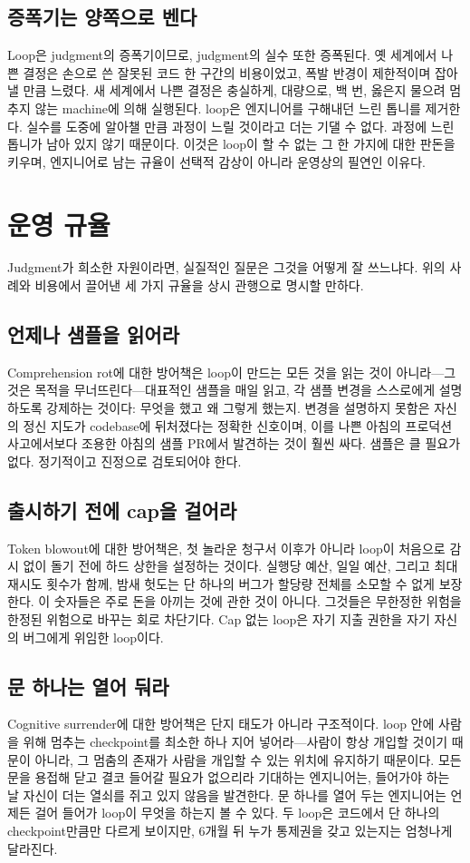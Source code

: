 \documentclass[conference]{IEEEtran}
\begin{document}
\subsection{증폭기는 양쪽으로 벤다}
Loop은 judgment의 증폭기이므로, judgment의 실수 또한 증폭된다. 옛 세계에서 나쁜 결정은 손으로 쓴 잘못된 코드 한 구간의 비용이었고, 폭발 반경이 제한적이며 잡아낼 만큼 느렸다. 새 세계에서 나쁜 결정은 충실하게, 대량으로, 백 번, 옳은지 물으려 멈추지 않는 machine에 의해 실행된다. loop은 엔지니어를 구해내던 느린 톱니를 제거한다. 실수를 도중에 알아챌 만큼 과정이 느릴 것이라고 더는 기댈 수 없다. 과정에 느린 톱니가 남아 있지 않기 때문이다. 이것은 loop이 할 수 없는 그 한 가지에 대한 판돈을 키우며, 엔지니어로 남는 규율이 선택적 감상이 아니라 운영상의 필연인 이유다.

\section{운영 규율}
Judgment가 희소한 자원이라면, 실질적인 질문은 그것을 어떻게 잘 쓰느냐다. 위의 사례와 비용에서 끌어낸 세 가지 규율을 상시 관행으로 명시할 만하다.

\subsection{언제나 샘플을 읽어라}
Comprehension rot에 대한 방어책은 loop이 만드는 모든 것을 읽는 것이 아니라---그것은 목적을 무너뜨린다---대표적인 샘플을 매일 읽고, 각 샘플 변경을 스스로에게 설명하도록 강제하는 것이다: 무엇을 했고 왜 그렇게 했는지. 변경을 설명하지 못함은 자신의 정신 지도가 codebase에 뒤처졌다는 정확한 신호이며, 이를 나쁜 아침의 프로덕션 사고에서보다 조용한 아침의 샘플 PR에서 발견하는 것이 훨씬 싸다. 샘플은 클 필요가 없다. 정기적이고 진정으로 검토되어야 한다.

\subsection{출시하기 전에 cap을 걸어라}
Token blowout에 대한 방어책은, 첫 놀라운 청구서 이후가 아니라 loop이 처음으로 감시 없이 돌기 전에 하드 상한을 설정하는 것이다. 실행당 예산, 일일 예산, 그리고 최대 재시도 횟수가 함께, 밤새 헛도는 단 하나의 버그가 할당량 전체를 소모할 수 없게 보장한다. 이 숫자들은 주로 돈을 아끼는 것에 관한 것이 아니다. 그것들은 무한정한 위험을 한정된 위험으로 바꾸는 회로 차단기다. Cap 없는 loop은 자기 지출 권한을 자기 자신의 버그에게 위임한 loop이다.

\subsection{문 하나는 열어 둬라}
Cognitive surrender에 대한 방어책은 단지 태도가 아니라 구조적이다. loop 안에 사람을 위해 멈추는 checkpoint를 최소한 하나 지어 넣어라---사람이 항상 개입할 것이기 때문이 아니라, 그 멈춤의 존재가 사람을 개입할 수 있는 위치에 유지하기 때문이다. 모든 문을 용접해 닫고 결코 들어갈 필요가 없으리라 기대하는 엔지니어는, 들어가야 하는 날 자신이 더는 열쇠를 쥐고 있지 않음을 발견한다. 문 하나를 열어 두는 엔지니어는 언제든 걸어 들어가 loop이 무엇을 하는지 볼 수 있다. 두 loop은 코드에서 단 하나의 checkpoint만큼만 다르게 보이지만, 6개월 뒤 누가 통제권을 갖고 있는지는 엄청나게 달라진다.
\end{document}
